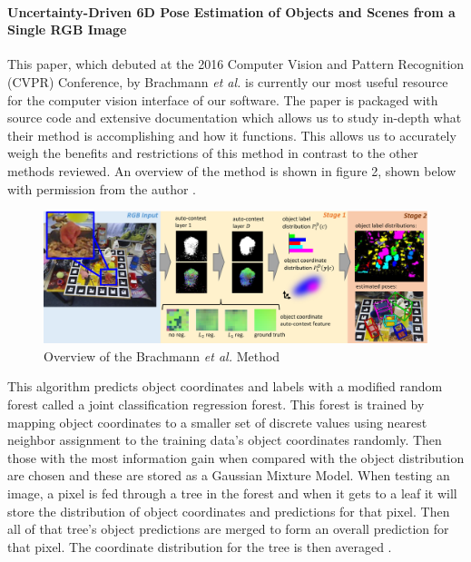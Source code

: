 \documentclass[12pt]{article}
\begin{document}
\paragraph{Uncertainty-Driven 6D Pose Estimation of Objects and Scenes
from a Single RGB
Image}\label{uncertainty-driven-6d-pose-estimation-of-objects-and-scenes-from-a-single-rgb-image}

This paper, which debuted at the 2016 Computer Vision and Pattern
Recognition (CVPR) Conference, by Brachmann \emph{et al.} is currently
our most useful resource for the computer vision interface of our
software. The paper is packaged with source code and extensive
documentation which allows us to study in-depth what their method is
accomplishing and how it functions. This allows us to accurately weigh
the benefits and restrictions of this method in contrast to the other
methods reviewed. An overview of the method is shown in figure 2, shown
below with permission from the author \autocite{brachmann}.

\begin{figure}
\centering
\includegraphics{Pictures/figure2.png}
\caption{Overview of the Brachmann \emph{et al.} Method}
\end{figure}

This algorithm predicts object coordinates and labels with a modified
random forest called a joint classification regression forest. This
forest is trained by mapping object coordinates to a smaller set of
discrete values using nearest neighbor assignment to the training data's
object coordinates randomly. Then those with the most information gain
when compared with the object distribution are chosen and these are
stored as a Gaussian Mixture Model. When testing an image, a pixel is
fed through a tree in the forest and when it gets to a leaf it will
store the distribution of object coordinates and predictions for that
pixel. Then all of that tree's object predictions are merged to form an
overall prediction for that pixel. The coordinate distribution for the
tree is then averaged \autocite{brachmann}.
\end{document}
